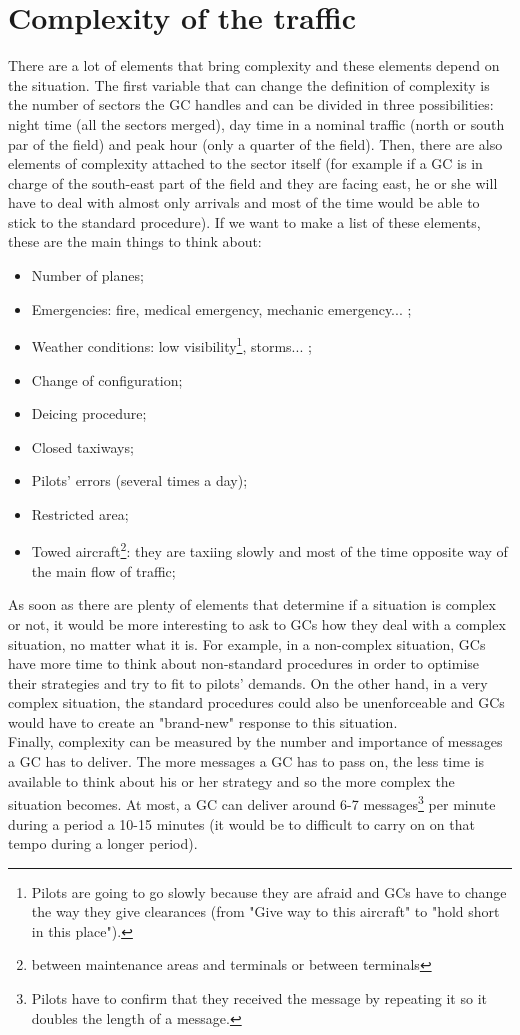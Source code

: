 \documentclass{article}
\begin{document}
\section{Complexity of the traffic}
There are a lot of elements that bring complexity and these elements depend on the situation. The first variable that can change the definition of complexity is the number of sectors the GC handles and can be divided in three possibilities: night time (all the sectors merged), day time in a nominal traffic (north or south par of the field) and peak hour (only a quarter of the field). Then, there are also elements of complexity attached to the sector itself (for example if a GC is in charge of the south-east part of the field and they are facing east, he or she will have to deal with almost only arrivals and most of the time would be able to stick to the standard procedure). If we want to make a list of these elements, these are the main things to think about:
\begin{itemize}
    \item Number of planes;
    \item Emergencies: fire, medical emergency, mechanic emergency... ; 
    \item Weather conditions: low visibility\footnote{Pilots are going to go slowly because they are afraid and GCs have to change the way they give clearances (from "Give way to this aircraft" to "hold short in this place").}, storms... ;
    \item Change of configuration;
    \item Deicing procedure;
    \item Closed taxiways;
    \item Pilots' errors (several times a day);
    \item Restricted area;
    \item Towed aircraft\footnote{between maintenance areas and terminals or between terminals}: they are taxiing slowly and most of the time opposite way of the main flow of traffic;
\end{itemize}
As soon as there are plenty of elements that determine if a situation is complex or not, it would be more interesting to ask to GCs how they deal with a complex situation, no matter what it is. For example, in a non-complex situation, GCs have more time to think about non-standard procedures in order to optimise their strategies and try to fit to pilots' demands. On the other hand, in a very complex situation, the standard procedures could also be unenforceable and GCs would have to create an "brand-new" response to this situation.\\
Finally, complexity can be measured by the number and importance of messages a GC has to deliver. The more messages a GC has to pass on, the less time is available to think about his or her strategy and so the more complex the situation becomes. At most, a GC can deliver around 6-7 messages\footnote{Pilots have to confirm that they received the message by repeating it so it doubles the length of a message.} per minute during a period a 10-15 minutes (it would be to difficult to carry on on that tempo during a longer period). 
\end{document}

